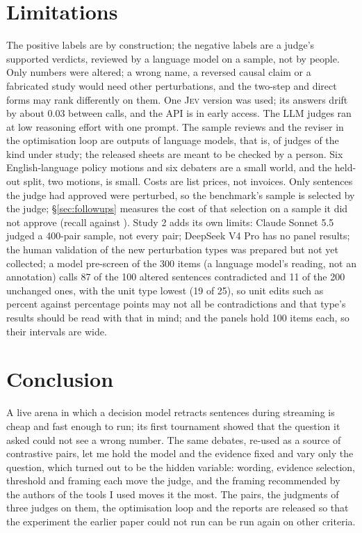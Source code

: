 \documentclass[11pt,a4paper]{article}
\newcommand{\jev}{\textsc{Jev}}
\begin{document}
\section{Limitations}

The positive labels are by construction; the negative labels are a judge's supported verdicts, reviewed by a language model on a sample, not by people. Only numbers were altered; a wrong name, a reversed causal claim or a fabricated study would need other perturbations, and the two-step and direct forms may rank differently on them. One \jev{} version was used; its answers drift by about 0.03 between calls, and the API is in early access. The LLM judges ran at low reasoning effort with one prompt. The sample reviews and the reviser in the optimisation loop are outputs of language models, that is, of judges of the kind under study; the released sheets are meant to be checked by a person. Six English-language policy motions and six debaters are a small world, and the held-out split, two motions, is small. Costs are list prices, not invoices. Only sentences the judge had approved were perturbed, so the benchmark's sample is selected by the judge; \S\ref{sec:followups} measures the cost of that selection on a sample it did not approve (recall \studyUnapprovedRecallTwoZero{} against \studyUnapprovedRecallBenchmarkTwoZero{}). Study 2 adds its own limits: Claude Sonnet 5.5 judged a 400-pair sample, not every pair; DeepSeek V4 Pro has no panel results; the human validation of the new perturbation types was prepared but not yet collected; a model pre-screen of the 300 items (a language model's reading, not an annotation) calls 87 of the 100 altered sentences contradicted and 11 of the 200 unchanged ones, with the unit type lowest (19 of 25), so unit edits such as percent against percentage points may not all be contradictions and that type's results should be read with that in mind; and the panels hold 100 items each, so their intervals are wide.

\section{Conclusion}

A live arena in which a decision model retracts sentences during streaming is cheap and fast enough to run; its first tournament showed that the question it asked could not see a wrong number. The same debates, re-used as a source of contrastive pairs, let me hold the model and the evidence fixed and vary only the question, which turned out to be the hidden variable: wording, evidence selection, threshold and framing each move the judge, and the framing recommended by the authors of the tools I used moves it the most. The pairs, the judgments of three judges on them, the optimisation loop and the reports are released so that the experiment the earlier paper could not run can be run again on other criteria.
\end{document}
